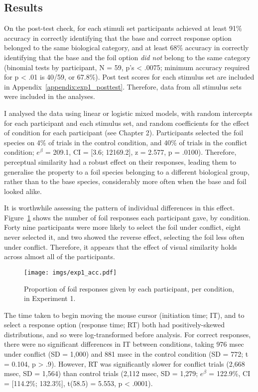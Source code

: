
\subsection{Results}

On the post-test check,
for each stimuli set participants achieved at least 91\% accuracy
in correctly identifying that the base and correct response option
belonged to the same biological category,
and at least 68\% accuracy in correctly identifying that
the base and the foil option \emph{did not} belong to the same category
(binomial tests by participant, N = 59, p's < .0075;
minimum accuracy required for p < .01 is 40/59, or 67.8\%).
Post test scores for each stimulus set are included
in Appendix~\ref{appendix:exp1_posttest}.
Therefore, data from all stimulus sets
were included in the analyses.


I analysed the data using linear or logistic mixed models,
with random intercepts for each participant and each stimulus set,
and random coefficients for the effect of condition for each participant
(see Chapter 2).
Participants selected the foil species
on 4\% of trials in the control condition,
and 40\% of trials in the conflict condition;
$e^{\beta}$ = 209.1, CI = [3.6; 12169.2],
z = 2.577, p = .0100).
Therefore, perceptual similarity had a robust effect on their responses,
leading them to generalise the property to a foil species
belonging to a different biological group,
rather than to the base species,
considerably more often when the base and foil looked alike.


It is worthwhile assessing the pattern of individual differences in this effect.
Figure~\ref{fig:exp1_acc} shows the number of foil responses
each participant gave, by condition.
Forty nine participants were more likely to select the foil under conflict,
eight never selected it, and two showed the reverse effect, selecting the foil
less often under conflict.
Therefore, it appears that the effect of visual similarity
holds across almost all of the participants.

\begin{figure}[ht]
  \centering
  \texttt{[image: imgs/exp1\_acc.pdf]}
  \caption{
    Proportion of foil responses given by each participant, per condition, in Experiment 1.
    \label{fig:exp1_acc} }
\end{figure}

The time taken to begin moving the mouse cursor (initiation time; IT),
and to select a response option (response time; RT)
both had positively-skewed distributions,
and so were log-transformed before analysis.
For correct responses,
there were no significant differences in IT between conditions,
taking 976 msec under conflict (SD = 1,000)
and 881 msec in the control condition (SD = 772; t = 0.104, p > .9).
However, RT was significantly slower
for conflict trials (2,668 msec, SD = 1,564)
than control trials (2,112 msec, SD = 1,279;
$e^{\beta}$ = 122.9\%, CI = [114.2\%; 132.3\%], t(58.5) = 5.553, p < .0001).

